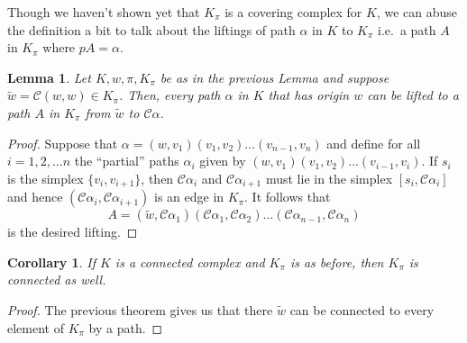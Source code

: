 \documentclass[12pt]{article}
\newtheorem{lemma}{Lemma}
\newtheorem{corollary}{Corollary}[theorem]
\theoremstyle{definition}
\numberwithin{equation}{theorem}
\begin{document}
Though we haven't shown yet that $K_{\pi}$ is a covering complex for $K$, we can abuse the definition a bit to talk about the liftings of path $\alpha$ in $K$ to $K_{\pi}$ i.e.\ a path $A$ in $K_{\pi}$ where $pA = \alpha$.

\begin{lemma}
  \label{lem:pilift}
  Let $K,w,\pi,K_{\pi}$ be as in the previous Lemma and suppose $\tilde{w} = \mathcal{C}(w,w) \in K_{\pi}$. Then, every path $\alpha$ in $K$ that has origin $w$ can be lifted to a path $A$ in $K_{\pi}$ from $\tilde{w}$ to $\mathcal{C}\alpha$.
\end{lemma}

\begin{proof}
  Suppose that $\alpha = (w,v_1)(v_1,v_2) \dots (v_{n-1},v_n)$ and define for all $i = 1, 2, \dots n$ the ``partial'' paths $\alpha_i$ given by $(w,v_1)(v_1,v_2) \dots (v_{i-1},v_i)$. If $s_i$ is the simplex $\{v_i,v_{i+1}\}$, then $\mathcal{C}\alpha_i$ and $\mathcal{C}\alpha_{i+1}$ must lie in the simplex $[s_i,\mathcal{C}\alpha_i]$ and hence $(\mathcal{C}\alpha_i,\mathcal{C}\alpha_{i+1})$ is an edge in $K_{\pi}$. It follows that
  \begin{equation*}
    A = (\tilde{w},\mathcal{C}\alpha_{1})(\mathcal{C}\alpha_1,\mathcal{C}\alpha_2) \dots (\mathcal{C}\alpha_{n-1},\mathcal{C}\alpha_n)
  \end{equation*}
  is the desired lifting.
\end{proof}

\begin{corollary}
  If $K$ is a connected complex and $K_\pi$ is as before, then $K_\pi$ is connected as well.
\end{corollary}
\begin{proof}
  The previous theorem gives us that there $\tilde{w}$ can be connected to every element of $K_{\pi}$ by a path.
\end{proof}
\end{document}
